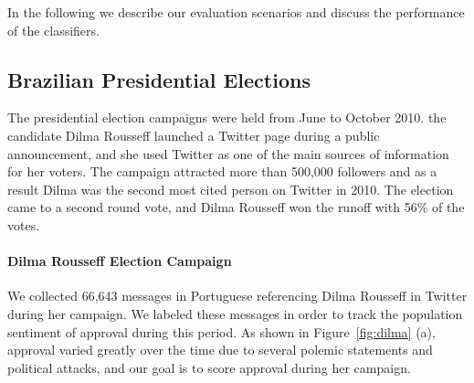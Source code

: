 In the following we describe our evaluation scenarios and discuss the
performance of the classifiers.

\subsection{Brazilian Presidential Elections}

The presidential election campaigns were held from June to October 2010.
the candidate Dilma Rousseff launched a Twitter page during a public announcement, and she used Twitter as one of the main sources of information for her voters. The campaign attracted more than 500,000 followers and
as a result Dilma was the second most cited person on Twitter in 2010.
The election came to a second round vote, and Dilma Rousseff won the runoff with 56\% of the votes.

\paragraph*{\bf{Dilma Rousseff Election Campaign}} We collected 66,643 messages in Portuguese referencing Dilma Rousseff in Twitter during her campaign. We labeled these messages in order to track the population sentiment of approval during this period. As shown in Figure~\ref{fig:dilma} (a), approval varied greatly over the time due to several polemic statements and political attacks, and our goal is to score approval during her campaign.

